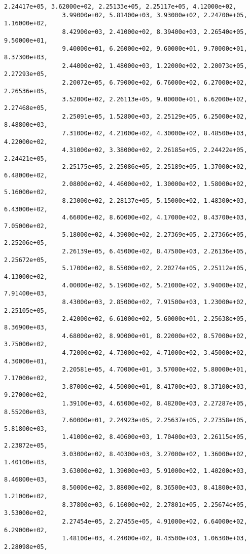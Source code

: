\documentclass[11pt]{article}
\begin{document}
\begin{Verbatim}[commandchars=\\\{\}]
                2.24417e+05, 3.62000e+02, 2.25133e+05, 2.25117e+05, 4.12000e+02,
                3.99000e+02, 5.81400e+03, 3.93000e+02, 2.24700e+05, 1.16000e+02,
                8.42900e+03, 2.41000e+02, 8.39400e+03, 2.26540e+05, 9.50000e+01,
                9.40000e+01, 6.26000e+02, 9.60000e+01, 9.70000e+01, 8.37300e+03,
                2.44000e+02, 1.48000e+03, 1.22000e+02, 2.20073e+05, 2.27293e+05,
                2.20072e+05, 6.79000e+02, 6.76000e+02, 6.27000e+02, 2.26536e+05,
                3.52000e+02, 2.26113e+05, 9.00000e+01, 6.62000e+02, 2.27468e+05,
                2.25091e+05, 1.52800e+03, 2.25129e+05, 6.25000e+02, 8.48800e+03,
                7.31000e+02, 4.21000e+02, 4.30000e+02, 8.48500e+03, 4.22000e+02,
                4.31000e+02, 3.38000e+02, 2.26185e+05, 2.24422e+05, 2.24421e+05,
                2.25175e+05, 2.25086e+05, 2.25189e+05, 1.37000e+02, 6.48000e+02,
                2.08000e+02, 4.46000e+02, 1.30000e+02, 1.58000e+02, 5.16000e+02,
                8.23000e+02, 2.28137e+05, 5.15000e+02, 1.48300e+03, 6.43000e+02,
                4.66000e+02, 8.60000e+02, 4.17000e+02, 8.43700e+03, 7.05000e+02,
                5.18000e+02, 4.39000e+02, 2.27369e+05, 2.27366e+05, 2.25206e+05,
                2.26139e+05, 6.45000e+02, 8.47500e+03, 2.26136e+05, 2.25672e+05,
                5.17000e+02, 8.55000e+02, 2.20274e+05, 2.25112e+05, 4.13000e+02,
                4.00000e+02, 5.19000e+02, 5.21000e+02, 3.94000e+02, 7.91400e+03,
                8.43000e+03, 2.85000e+02, 7.91500e+03, 1.23000e+02, 2.25105e+05,
                2.42000e+02, 6.61000e+02, 5.60000e+01, 2.25638e+05, 8.36900e+03,
                4.68000e+02, 8.90000e+01, 8.22000e+02, 8.57000e+02, 3.75000e+02,
                4.72000e+02, 4.73000e+02, 4.71000e+02, 3.45000e+02, 4.30000e+01,
                2.20581e+05, 4.70000e+01, 3.57000e+02, 5.80000e+01, 7.17000e+02,
                3.87000e+02, 4.50000e+01, 8.41700e+03, 8.37100e+03, 9.27000e+02,
                1.39100e+03, 4.65000e+02, 8.48200e+03, 2.27287e+05, 8.55200e+03,
                7.60000e+01, 2.24923e+05, 2.25637e+05, 2.27358e+05, 5.81800e+03,
                1.41000e+02, 8.40600e+03, 1.70400e+03, 2.26115e+05, 2.23872e+05,
                3.03000e+02, 8.40300e+03, 3.27000e+02, 1.36000e+02, 1.40100e+03,
                3.63000e+02, 1.39000e+03, 5.91000e+02, 1.40200e+03, 8.46800e+03,
                8.50000e+02, 3.88000e+02, 8.36500e+03, 8.41800e+03, 1.21000e+02,
                8.37800e+03, 6.16000e+02, 2.27801e+05, 2.25674e+05, 3.53000e+02,
                2.27454e+05, 2.27455e+05, 4.91000e+02, 6.64000e+02, 6.29000e+02,
                1.48100e+03, 4.24000e+02, 8.43500e+03, 1.06300e+03, 2.28098e+05,

\end{Verbatim}
\end{document}
